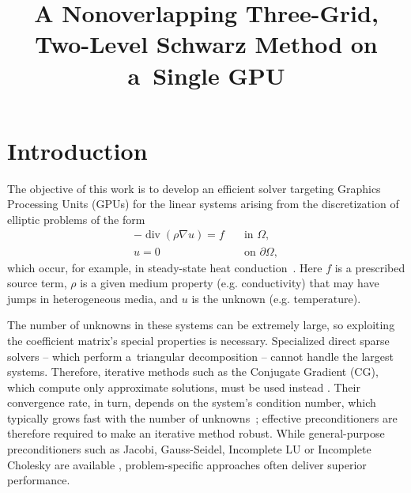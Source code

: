 \documentclass[11pt]{article}
\title{A Nonoverlapping Three-Grid, Two-Level Schwarz Method on a~Single GPU}
\theoremstyle{definition}
\theoremstyle{theorem}
\begin{document}
\maketitle



\section{Introduction}

The objective of this work is to develop an efficient solver targeting
Graphics Processing Units (GPUs) \cite{cuda-guide} for the linear systems
arising from the discretization of elliptic problems of the form
\begin{equation}
  \begin{array}{rl}
    -\operatorname{div}(\rho \nabla u)=f\quad & \text{in }\Omega,\\
    u=0\quad & \text{on }\partial \Omega,
  \end{array}
  \label{div_eq}
\end{equation}
which occur, for example, in steady-state heat conduction~\cite{Ern-FEM}.
Here $f$ is a prescribed source term, $\rho$ is a given medium property
(e.g. conductivity) that may have jumps in heterogeneous media,
and $u$ is the unknown (e.g. temperature).

The number of unknowns in these systems can be extremely large, so exploiting the
coefficient matrix's special properties is necessary.
Specialized direct sparse solvers -- which perform a~triangular
decomposition -- cannot handle the largest systems. Therefore, iterative methods
such as the Conjugate Gradient (CG), which compute only approximate solutions,
must be used instead \cite{Saad}.
Their convergence rate, in turn, depends on the system's condition number, which
typically grows fast with the number of unknowns~\cite{Ern-FEM};
effective preconditioners are therefore required to make an iterative method robust.
While general-purpose preconditioners such as Jacobi, Gauss-Seidel,
Incomplete LU or Incomplete Cholesky are available
\cite{Saad, cusparse}, problem\nobreakdash-specific approaches often deliver superior
performance.
\end{document}
